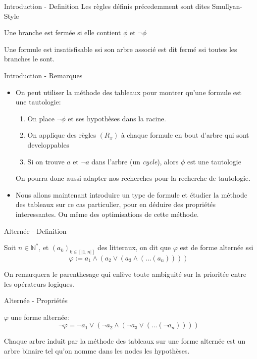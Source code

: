 \documentclass[]{beamer}
\begin{document}
\begin{frame}{Introduction - Definition}
    Les règles définis précedemment sont dites Smullyan-Style

    \begin{definition}
        Une branche est fermée si elle contient $\phi$ et $\lnot\phi$
    \end{definition}
    Une formule est insatisfisable ssi son arbre associé est dit fermé ssi toutes les branches le sont.
\end{frame}

\begin{frame}{Introduction - Remarques}
    \begin{itemize}
        \item On peut utiliser la méthode des tableaux pour montrer qu'une formule est une tautologie:
        \begin{enumerate}
            \item On place $\lnot\phi$ et ses hypothèses dans la racine.
            \item On applique des règles $(R_x)$ à chaque formule en bout d'arbre qui sont developpables
            \item Si on trouve $a$ et $\lnot a$ dans l'arbre (un \textit{cycle}), alors $\phi$ est une tautologie
        \end{enumerate}
        On pourra donc aussi adapter nos recherches pour la recherche de tautologie.
        
        \item Nous allons maintenant introduire un type de formule et étudier la méthode des tableaux sur ce cas particulier, pour en déduire des propriétés interessantes.
        Ou même des optimisations de cette méthode.
    \end{itemize}
\end{frame}

\begin{frame}{Alternée - Definition}
    \begin{definition}
        Soit $n\in\mathbb{N}^*$, et $(a_k)_{k\in [|1,n|]}$ des litteraux, on dit que $\varphi$ est de forme alternée ssi
        $$\varphi := a_1\land(a_2\lor(a_3\land(\dots(a_n))))$$
    \end{definition}
    \pause
    On remarquera le parenthesage qui enlève toute ambiguité sur la prioritée entre les opérateurs logiques.
\end{frame}

\begin{frame}{Alternée - Propriétés}
    \begin{theorem}
        $\varphi$ une forme alternée: 
        $$\lnot\varphi = \lnot a_1\lor(\lnot a_2\land(\lnot a_3 \lor(\dots(\lnot a_n))))$$
    \end{theorem}
    \pause
    \begin{theorem}
        Chaque arbre induit par la méthode des tableaux sur une forme alternée est un arbre binaire tel qu'on nomme dans les nodes les hypothèses.
    \end{theorem}
\end{frame}
\end{document}
